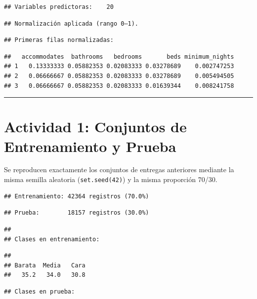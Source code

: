 \documentclass[
]{article}
\begin{document}
\begin{verbatim}
## Variables predictoras:    20
\end{verbatim}

\begin{verbatim}
## Normalización aplicada (rango 0–1).
\end{verbatim}

\begin{verbatim}
## Primeras filas normalizadas:
\end{verbatim}

\begin{verbatim}
##   accommodates  bathrooms   bedrooms       beds minimum_nights
## 1   0.13333333 0.05882353 0.02083333 0.03278689    0.002747253
## 2   0.06666667 0.05882353 0.02083333 0.03278689    0.005494505
## 3   0.06666667 0.05882353 0.02083333 0.01639344    0.008241758
\end{verbatim}

\begin{center}\rule{0.5\linewidth}{0.5pt}\end{center}

\section{Actividad 1: Conjuntos de Entrenamiento y
Prueba}\label{actividad-1-conjuntos-de-entrenamiento-y-prueba}

Se reproducen exactamente los conjuntos de entregas anteriores mediante
la misma semilla aleatoria (\texttt{set.seed(42)}) y la misma proporción
70/30.

\begin{verbatim}
## Entrenamiento: 42364 registros (70.0%)
\end{verbatim}

\begin{verbatim}
## Prueba:        18157 registros (30.0%)
\end{verbatim}

\begin{verbatim}
## 
## Clases en entrenamiento:
\end{verbatim}

\begin{verbatim}
## 
## Barata  Media   Cara 
##   35.2   34.0   30.8
\end{verbatim}

\begin{verbatim}
## Clases en prueba:
\end{verbatim}
\end{document}
